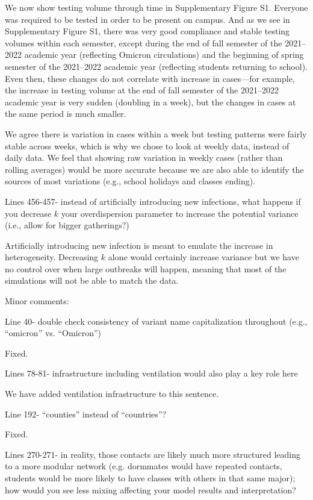 \documentclass[12pt]{article}
\newcommand{\revtext}{\textsf}
\begin{document}
We now show testing volume through time in Supplementary Figure S1.
Everyone was required to be tested in order to be present on campus. 
And as we see in Supplementary Figure S1, there was very good compliance and stable testing volumes within each semester, except during the end of fall semester of the 2021--2022 academic year (reflecting Omicron circulations) and the beginning of spring semester of the 2021--2022 academic year (reflecting students returning to school).
Even then, these changes do not correlate with increase in cases---for example, the increase in testing volume at the end of fall semester of the 2021--2022 academic year is very sudden (doubling in a week), but the changes in cases at the same period is much smaller.

We agree there is variation in cases within a week but testing patterns were fairly stable across weeks, which is why we chose to look at weekly data, instead of daily data.
We feel that showing raw variation in weekly cases (rather than rolling averages) would be more accurate because we are also able to identify the sources of most variations (e.g., school holidays and classes ending).

\revtext{Lines 456-457- instead of artificially introducing new infections, what happens if you decrease $k$ your overdispersion parameter to increase the potential variance (i.e., allow for bigger gatherings?)}

Artificially introducing new infection is meant to emulate the increase in heterogeneity.
Decreasing $k$ alone would certainly increase variance but we have no control over when large outbreaks will happen, meaning that most of the simulations will not be able to match the data.

\revtext{Minor comments:} 

\revtext{Line 40- double check consistency of variant name capitalization throughout (e.g., “omicron” vs. “Omicron”)}

Fixed.

\revtext{Lines 78-81- infrastructure including ventilation would also play a key role here}

We have added ventilation infrastructure to this sentence.

\revtext{Line 192- “counties” instead of “countries”?}

Fixed.

\revtext{Lines 270-271- in reality, those contacts are likely much more structured leading to a more modular network (e.g. dormmates would have repeated contacts, students would be more likely to have classes with others in that same major); how would you see less mixing affecting your model results and interpretation?}
\end{document}
